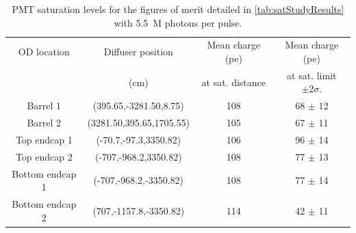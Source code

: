 \documentclass[a4paper,11pt]{article}
\begin{document}
\begin{table}[ht!]
    \centering
    \begin{tabular}{|c|c|c|c|}
    \hline
        OD location &Diffuser position & Mean charge (pe)   & Mean charge (pe)    \\
                    &  (cm)                & at sat. distance & at sat. limit $\pm2\sigma$.  \\
        \hline
        Barrel 1       & (395.65,-3281.50,8.75)   & 108  & 68 $\pm$ 12 \\ 
        Barrel 2       & (3281.50,395.65,1705.55) & 105  & 67 $\pm$ 11 \\ 
        Top endcap 1   & (-70.7,-97.3,3350.82)    & 106  & 96 $\pm$ 14 \\
        Top endcap 2   & (-707,-968.2,3350.82)    & 108  & 77 $\pm$ 13 \\
        Bottom endcap 1 & (-707,-968.2,-3350.82)  & 108  & 77 $\pm$ 14 \\ 
        Bottom endcap 2 & (707,-1157.8,-3350.82)  & 114  & 42 $\pm$ 11 \\ 
        \hline
    \end{tabular}
    \caption{PMT saturation levels for the figures of merit detailed in \cref{tab:satStudyResults} with 5.5~M photons per pulse.}
    \label{tab:satStudyResults_pevalues}
\end{table}
\end{document}
